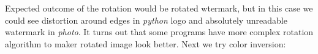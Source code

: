 \documentclass[a4paper, 12pt]{article}
\begin{document}
		\begin{figure}[h]%
			\centering
			\qquad
			\label{}%
		\end{figure}
	
	\newpage

    	Expected outcome of the rotation would be rotated wtermark, but in this case we could see distortion around edges in \textit{python} logo and absolutely unreadable watermark in \textit{photo}. It turns out that some programs have more complex rotation algorithm to maker rotated image look better. Next we try color inversion:
    	
 		\begin{figure}[!h]%
    		\centering
    		\qquad
    		\label{}%
    	\end{figure}
\end{document}
